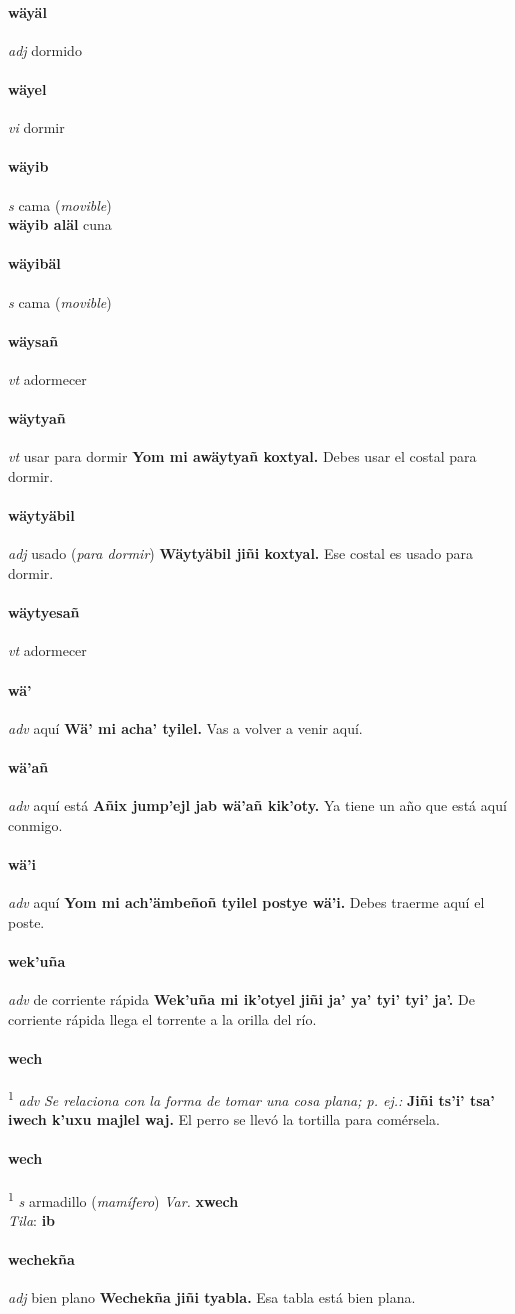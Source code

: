 \documentclass{scrbook}
\newcommand{\entry}[1]{\paragraph{#1}}
\newcommand{\defsuperscript}[1]{\textsuperscript{1}}
\newcommand{\nontranslationdef}[1]{\textit{#1}}
\newcommand{\partofspeech}[1]{\textit{#1}}
\newcommand{\spanishtranslation}[1]{#1}
\newcommand{\clarification}[1]{(\textit{#1})}
\newcommand{\cholexample}[1]{\textbf{#1}}
\newcommand{\exampletranslation}[1]{#1}
\newcommand{\dialectvariant}[1]{\\\textit{#1}:}
\newcommand{\dialectword}[1]{\textbf{#1}}
\newcommand{\secondaryentry}[1]{\\\textbf{#1}}
\newcommand{\secondtranslation}[1]{#1}
\newcommand{\variation}[1]{\textit{Var.} \textbf{#1}}
\begin{document}
\begin{multicols}{2}
\entry{wäyäl}
\partofspeech{adj}
\spanishtranslation{dormido}

\entry{wäyel}
\partofspeech{vi}
\spanishtranslation{dormir}

\entry{wäyib}
\partofspeech{s}
\spanishtranslation{cama}
\clarification{movible}
\secondaryentry{wäyib aläl}
\secondtranslation{cuna}

\entry{wäyibäl}
\partofspeech{s}
\spanishtranslation{cama}
\clarification{movible}

\entry{wäysañ}
\partofspeech{vt}
\spanishtranslation{adormecer}

\entry{wäytyañ}
\partofspeech{vt}
\spanishtranslation{usar para dormir}
\cholexample{Yom mi awäytyañ koxtyal.}
\exampletranslation{Debes usar el costal para dormir.}

\entry{wäytyäbil}
\partofspeech{adj}
\spanishtranslation{usado}
\clarification{para dormir}
\cholexample{Wäytyäbil jiñi koxtyal.}
\exampletranslation{Ese costal es usado para dormir.}

\entry{wäytyesañ}
\partofspeech{vt}
\spanishtranslation{adormecer}

\entry{wä'}
\partofspeech{adv}
\spanishtranslation{aquí}
\cholexample{Wä' mi acha' tyilel.}
\exampletranslation{Vas a volver a venir aquí.}

\entry{wä'añ}
\partofspeech{adv}
\spanishtranslation{aquí está}
\cholexample{Añix jump'ejl jab wä'añ kik'oty.}
\exampletranslation{Ya tiene un año que está aquí conmigo.}

\entry{wä'i}
\partofspeech{adv}
\spanishtranslation{aquí}
\cholexample{Yom mi ach'ämbeñoñ tyilel postye wä'i.}
\exampletranslation{Debes traerme aquí el poste.}

\entry{wek'uña}
\partofspeech{adv}
\spanishtranslation{de corriente rápida}
\cholexample{Wek'uña mi ik'otyel jiñi ja' ya' tyi' tyi' ja'.}
\exampletranslation{De corriente rápida llega el torrente a la orilla del río.}

\entry{wech}
\defsuperscript{1}
\partofspeech{adv}
\nontranslationdef{Se relaciona con la forma de tomar una cosa plana; p. ej.:}
\cholexample{Jiñi ts'i' tsa' iwech k'uxu majlel waj.}
\exampletranslation{El perro se llevó la tortilla para comérsela.}

\entry{wech}
\defsuperscript{2}
\partofspeech{s}
\spanishtranslation{armadillo}
\clarification{mamífero}
\variation{xwech}
\dialectvariant{Tila}
\dialectword{ib}

\entry{wechekña}
\partofspeech{adj}
\spanishtranslation{bien plano}
\cholexample{Wechekña jiñi tyabla.}
\exampletranslation{Esa tabla está bien plana.}


\end{multicols}
\end{document}
